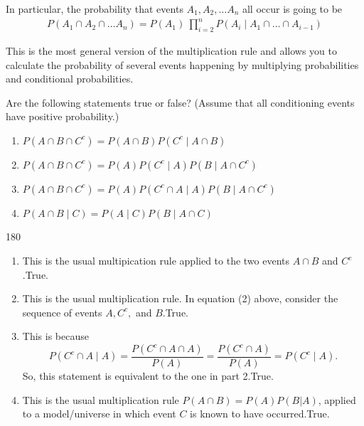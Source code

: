 \documentclass{tufte-handout}
\begin{document}
In particular, the probability that events $A_1, A_2, \ldots A_n$ all occur is going to be 
\begin{align}
P(A_1 \cap A_2 \cap \ldots A_n) = P(A_1) \ \prod_{i = 2}^n P (A_i \mid A_1 \cap \ldots \cap A_{i-1})
\end{align}


This is the most general version of the multiplication rule and allows you to calculate the probability
of several events happening by multiplying probabilities and conditional probabilities.



 Are the following statements true or false? 
(Assume that all conditioning events have positive probability.)
\begin{enumerate}
\item $P(A \cap B \cap C^c) = P(A \cap B) P(C^c \mid A \cap B)$
\item $P(A \cap B \cap C^c) = P(A) P( C^c \mid A) P( B \mid A \cap C^c)$
\item $P(A \cap B \cap C^c) = P(A) P( C^c \cap A \mid A) P( B \mid A \cap C^c)$
\item $P(A \cap B \mid C) = P( A \mid C) P( B \mid A \cap C)$
\end{enumerate}

\vspace{3mm}
\begin{turn}{180} 
\color{teal}
\begin{minipage}{\linewidth}
\scriptsize
\begin{enumerate}
\item This is the usual multipication rule applied to the two events $A \cap B$  and $C^c$.True. 
\item This is the usual multiplication rule. In equation (2) above, consider the sequence of events $A, C^c,$ and $B$.True. 
\item This is because
$$
P( C^c \cap A \mid A) = \frac{P( C^c \cap A \cap A)}{P(A)} = \frac{P(C^c \cap A)}{P(A)} = P(C^c \mid A).
$$
So, this statement is equivalent to the one in part 2.True. 
\item This is the usual multiplication rule $P(A \cap B) = P(A) P(B | A)$, applied to a model/universe in which event $C$ is known to have occurred.True. 
\end{enumerate}
\end{minipage}
\end{turn}


\vspace{0.4cm}
\end{document}
